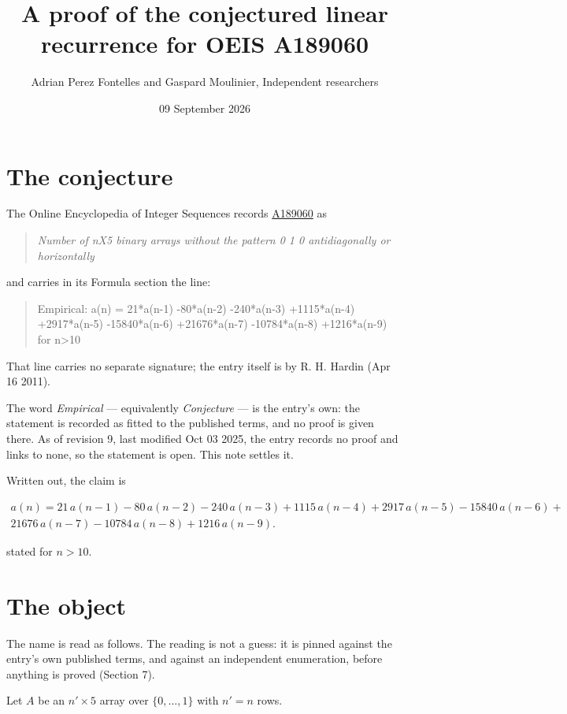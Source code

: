 \documentclass[11pt]{article}
\title{A proof of the conjectured linear recurrence for OEIS A189060}
\author{Adrian Perez Fontelles and Gaspard Moulinier, Independent researchers}
\date{09 September 2026}
\theoremstyle{definition}
\begin{document}
\maketitle
\section{The conjecture}

The Online Encyclopedia of Integer Sequences records \href{https://oeis.org/A189060}{A189060} as

\begin{quote}\itshape Number of nX5 binary arrays without the pattern 0 1 0 antidiagonally or horizontally\end{quote}

and carries in its Formula section the line:

\begin{quote}\ttfamily Empirical: a(n) = 21*a(n-1) -80*a(n-2) -240*a(n-3) +1115*a(n-4) +2917*a(n-5) -15840*a(n-6) +21676*a(n-7) -10784*a(n-8) +1216*a(n-9) for n>10\end{quote}

That line carries no separate signature; the entry itself is by R. H. Hardin (Apr 16 2011).

The word {\itshape Empirical} --- equivalently {\itshape Conjecture} --- is the entry's own: the statement is recorded as fitted to the published terms, and no proof is given there. As of revision 9, last modified Oct 03 2025, the entry records no proof and links to none, so the statement is open. This note settles it.

Written out, the claim is

\begin{multline*} a(n) = 21\,a(n-1) - 80\,a(n-2) - 240\,a(n-3) + 1115\,a(n-4) + 2917\,a(n-5) - 15840\,a(n-6) + \\ 21676\,a(n-7) - 10784\,a(n-8) + 1216\,a(n-9). \end{multline*}

stated for $n > 10$.

\section{The object}

The name is read as follows. The reading is not a guess: it is pinned against the entry's own published terms, and against an independent enumeration, before anything is proved (Section 7).

Let $A$ be an $n' \times 5$ array over $\{0,\dots,1\}$ with $n' = n$ rows.
\end{document}
